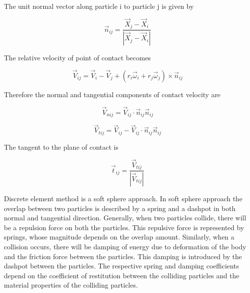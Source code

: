 The unit normal vector along particle i to particle j  is given by

\begin{equation}
  \label{eq:normal_unit}
  \vec{n}_{ij} = \frac{\vec{X}_{j} - \vec{X}_{i}}{|\vec{X}_{j} - \vec{X}_{i}|}
\end{equation}

The relative velocity of point of contact becomes

\begin{equation}
  \label{eq:relative}
  \vec{V}_{ij} = \vec{V}_{i} - \vec{V}_{j} +
  (r_{i} \vec{\omega}_{i} + r_{j} \vec{\omega}_{j}) \times \vec{n}_{ij}
\end{equation}

Therefore the normal and tangential components of contact velocity are

\begin{equation}
  \label{eq:normal_vel}
  \vec{V}_{nij} = \vec{V}_{ij} \cdot \vec{n}_{ij} \vec{n}_{ij}
\end{equation}

\begin{equation}
  \label{eq:tang_vel}
  \vec{V}_{tij} = \vec{V}_{ij} - \vec{V}_{ij} \cdot \vec{n}_{ij} \vec{n}_{ij}
\end{equation}

The tangent to the plane of contact is

\begin{equation}
  \label{eq:tang_unit}
  \vec{t}_{ij} = \frac{\vec{V}_{tij}}{|\vec{V}_{tij}|}
\end{equation}


Discrete element method is a soft sphere approach. In soft sphere
approach the overlap between two particles is described by a spring
and a dashpot in both normal and tangential direction. Generally, when
two particles collide, there will be a repulsion force on both the
particles. This repulsive force is represented by springs, whose
magnitude depends on the overlap amount. Similarly, when a collision
occurs, there will be damping of energy due to deformation of the body
and the friction force between the particles. This damping is
introduced by the dashpot between the particles. The respective spring
and damping coefficients depend on the coefficient of restitution
between the colliding particles and the material properties of the
colliding particles.





